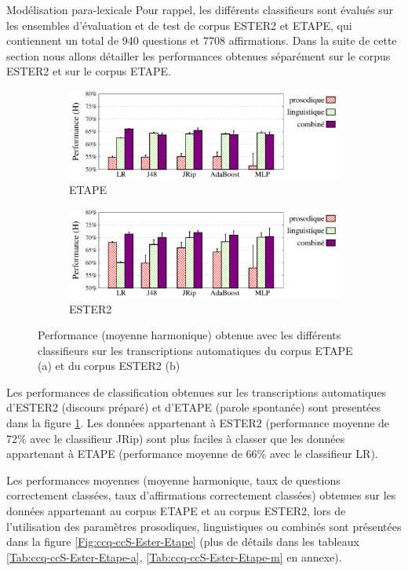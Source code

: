 \documentclass{style/these}
\begin{document}
\begin{part}{Modélisation para-lexicale}
Pour rappel, les différents classifieurs sont évalués sur les ensembles d'évaluation et de test de corpus ESTER2 et ETAPE, qui contiennent un total de 940 questions et 7708 affirmations. Dans la suite de cette section nous allons détailler les performances obtenues séparément sur le corpus ESTER2 et sur le corpus ETAPE.

\begin{figure}[h!]\begin{subfigure}{\textwidth}
\centering
\includegraphics[scale=0.6]{images/results/ETAPE_comparePLC_onAutomatic.pdf}
\caption{ETAPE}
\end{subfigure}
\begin{subfigure}{\textwidth}
\centering
\includegraphics[scale=0.6]{images/results/ESTER_comparePLC_onAutomatic.pdf}
\caption{ESTER2}
\end{subfigure}
\caption{Performance (moyenne harmonique) obtenue avec les différents classifieurs sur les transcriptions automatiques du corpus ETAPE (a) et du corpus ESTER2 (b)}
\label{Fig:QD-ESTER-ETAPE}
\end{figure}


Les performances de classification obtenues sur les transcriptions automatiques d'ESTER2 (discours préparé) et d'ETAPE (parole spontanée) sont presentées dans la figure \ref{Fig:QD-ESTER-ETAPE}. 
Les données appartenant à ESTER2 (performance moyenne de 72\% avec le classifieur JRip) sont plus faciles à classer que les données appartenant à ETAPE (performance moyenne de 66\% avec le classifieur LR). 


Les performances moyennes (moyenne harmonique, taux de questions correctement classées, taux d'affirmations correctement classées) obtenues sur les données appartenant au corpus ETAPE et au corpus ESTER2, lors de l'utilisation des paramètres prosodiques, linguistiques ou combinés sont présentées dans la figure \ref{Fig:ccq-ccS-Ester-Etape} (plus de détails dans les tableaux \ref{Tab:ccq-ccS-Ester-Etape-a}, \ref{Tab:ccq-ccS-Ester-Etape-m} en annexe). 


\end{part}
\end{document}
